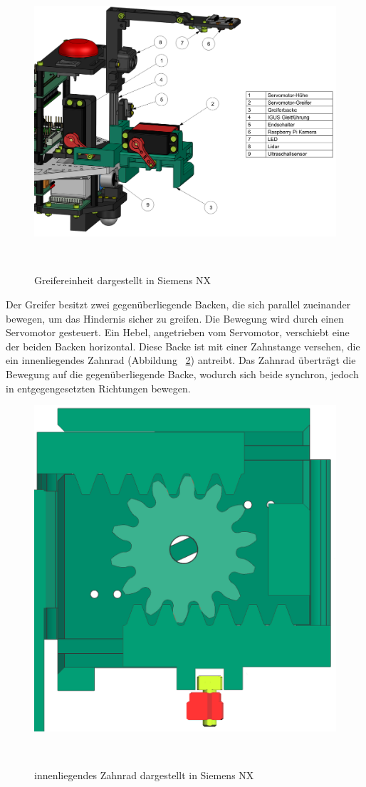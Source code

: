 \documentclass[main.tex]{subfiles} %
\begin{document}
\begin{figure}[H]
    \centering
    \includegraphics[width = 0.9\linewidth]{./fig_Mechanik/Greifereinheit_PREN2.png}
    \caption{Greifereinheit dargestellt in Siemens NX}~\label{fig:Greifereinheit}
\end{figure}


\newpage

Der Greifer besitzt zwei gegenüberliegende Backen, die sich parallel zueinander bewegen,
um das Hindernis sicher zu greifen. Die Bewegung wird durch einen Servomotor gesteuert.
Ein Hebel, angetrieben vom Servomotor, verschiebt eine der beiden Backen horizontal.
Diese Backe ist mit einer Zahnstange versehen, die ein innenliegendes Zahnrad (Abbildung ~\ref{fig:Zahnrad}) antreibt.
Das Zahnrad überträgt die Bewegung auf die gegenüberliegende Backe, wodurch sich beide
synchron, jedoch in entgegengesetzten Richtungen bewegen.

\begin{figure}[H]
    \centering
    \includegraphics[width = 0.45\linewidth]{./fig_Mechanik/Zahnrad.png}
    \caption{innenliegendes Zahnrad dargestellt in Siemens NX}~\label{fig:Zahnrad}
\end{figure}
\end{document}
